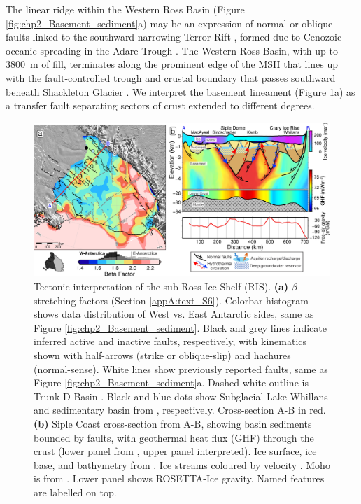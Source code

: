 The linear ridge within the Western Ross Basin (Figure \ref{fig:chp2_Basement_sediment}a) may be an expression of normal or oblique faults linked to the southward-narrowing Terror Rift \citep{saulineogene2021}, formed due to Cenozoic oceanic spreading in the Adare Trough \citep[Figure \ref{fig:chp2_Basement_sediment}b,][]{granotlate2018}. The Western Ross Basin, with up to 3800~m of fill, terminates along the prominent edge of the MSH that lines up with the fault-controlled trough and crustal boundary that passes southward beneath Shackleton Glacier \citep{borgisotopic1990}. We interpret the basement lineament (Figure \ref{fig:chp2_Tectonic_interpretation}a) as a transfer fault separating sectors of crust extended to different degrees. \\

\begin{figure}
    \includegraphics[width=\textwidth]{figures/chp2/Fig4_tectonic_interpretation.jpg}
    \caption[Tectonic interpretation of the sub-Ross Ice Shelf]{Tectonic interpretation of the sub-Ross Ice Shelf (RIS). 
    \textbf{(a)} $\beta$ stretching factors (Section \ref{appA:text_S6}). Colorbar histogram shows data distribution of West vs. East Antarctic sides, same as Figure \ref{fig:chp2_Basement_sediment}. Black and grey lines indicate inferred active and inactive faults, respectively, with kinematics shown with half-arrows (strike or oblique-slip) and hachures (normal-sense). White lines show previously reported faults, same as Figure \ref{fig:chp2_Basement_sediment}a. Dashed-white outline is Trunk D Basin \citep{bellidentifying2006}. Black and blue dots show Subglacial Lake Whillans and sedimentary basin from \citet{gustafsondynamic2022}, respectively. Cross-section A-B in red. \textbf{(b)} Siple Coast cross-section from A-B, showing basin sediments bounded by faults, with geothermal heat flux (GHF) through the crust (lower panel from \citet{burton-johnsongeothermal2020}, upper panel interpreted). Ice surface, ice base, and bathymetry from \citet{morlighemdeep2020}. Ice streams coloured by velocity \citep{mouginotcontinent2019, venturellimid2020}. Moho is from \citet{shencrust2018}. Lower panel shows ROSETTA-Ice gravity. Named features are labelled on top.} 
    \label{fig:chp2_Tectonic_interpretation}
\end{figure}

